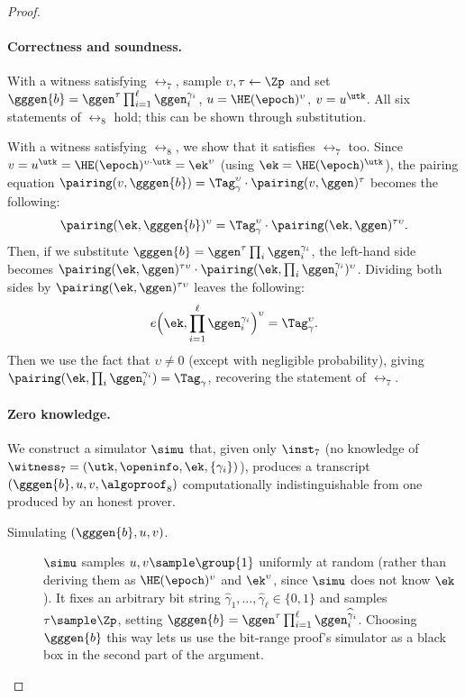 \begin{proof}

  \paragraph{Correctness and soundness.} With a witness satisfying $\rel_7$,
  sample $\upsilon, \tau \gets \Zp$ and set $\gggen{b} =
  \ggen^\tau\prod_{i=1}^{\ell}\ggen_i^{\gamma_i}$, $u = \HE(\epoch)^\upsilon$,
  $v = u^{\utk}$. All six statements of $\rel_8$ hold; this can be shown
  through substitution.

  With a witness satisfying $\rel_8$, we show that it satisfies $\rel_7$ too.
  Since $v = u^{\utk} = \HE(\epoch)^{\upsilon\cdot\utk} = \ek^\upsilon$ (using
  $\ek = \HE(\epoch)^{\utk}$), the pairing equation $\pairing(v, \gggen{b}) =
  \Tag_\gamma^\upsilon \cdot \pairing(v, \ggen)^\tau$ becomes the following:
%
  \begin{equation*}
%
    \pairing(\ek, \gggen{b})^\upsilon = \Tag_\gamma^\upsilon \cdot
    \pairing(\ek, \ggen)^{\tau\upsilon}.
  \end{equation*}
%
  Then, if we substitute $\gggen{b} = \ggen^\tau \prod_i \ggen_i^{\gamma_i}$,
  the left-hand side becomes $\pairing(\ek, \ggen)^{\tau\upsilon} \cdot
  \pairing(\ek, \prod_i \ggen_i^{\gamma_i})^\upsilon$. Dividing both sides by
  $\pairing(\ek,\ggen)^{\tau\upsilon}$ leaves the following:
%
  \begin{equation*}
%
    e\Big(\ek, \prod_{i=1}^\ell \ggen_i^{\gamma_i}\Big)^\upsilon =
    \Tag_\gamma^\upsilon.
  \end{equation*}
%
  Then we use the fact that $\upsilon \neq 0$ (except with negligible
  probability), giving $\pairing(\ek, \prod_i \ggen_i^{\gamma_i}) =
  \Tag_\gamma$, recovering the statement of $\rel_7$.

  \paragraph{Zero knowledge.} We construct a simulator $\simu$ that, given only
  $\inst_7$ (no knowledge of $\witness_7 = (\utk, \openinfo, \ek,
  \{\gamma_i\})$), produces a transcript $(\gggen{b}, u, v, \algoproof_8)$
  computationally indistinguishable from one produced by an honest prover.

  \begin{description}

    \item[Simulating $(\gggen{b}, u, v)$.] $\simu$ samples $u, v \sample
      \group{1}$ uniformly at random (rather than deriving them as
      $\HE(\epoch)^\upsilon$ and $\ek^\upsilon$, since $\simu$ does not know
      $\ek$). It fixes an arbitrary bit string
      $\widehat{\gamma}_1,\ldots,\widehat{\gamma}_\ell \in \{0,1\}$ and samples
      $\tau \sample \Zp$, setting $\gggen{b} = \ggen^\tau \prod_{i=1}^\ell
      \ggen_i^{\widehat{\gamma}_i}$. Choosing $\gggen{b}$ this way lets us use
      the bit-range proof's simulator as a black box in the second part of the
      argument.


\end{description}
\end{proof}
